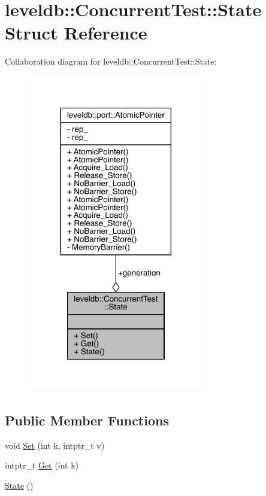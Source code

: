 \hypertarget{structleveldb_1_1_concurrent_test_1_1_state}{}\section{leveldb\+:\+:Concurrent\+Test\+:\+:State Struct Reference}
\label{structleveldb_1_1_concurrent_test_1_1_state}


Collaboration diagram for leveldb\+:\+:Concurrent\+Test\+:\+:State\+:\nopagebreak
\begin{figure}[H]
\begin{center}
\leavevmode
\includegraphics[width=218pt]{structleveldb_1_1_concurrent_test_1_1_state__coll__graph}
\end{center}
\end{figure}
\subsection*{Public Member Functions}
\begin{DoxyCompactItemize}
\item 
void \hyperlink{structleveldb_1_1_concurrent_test_1_1_state_a7f44f6357aab5ecc3b9b629da8ae71e1}{Set} (int k, intptr\+\_\+t v)
\item 
intptr\+\_\+t \hyperlink{structleveldb_1_1_concurrent_test_1_1_state_aef6bd2ca14d88d14af9bbb31f9991240}{Get} (int k)
\item 
\hyperlink{structleveldb_1_1_concurrent_test_1_1_state_af267d7a2063993cfdad5762ba52fb1b4}{State} ()
\end{DoxyCompactItemize}
